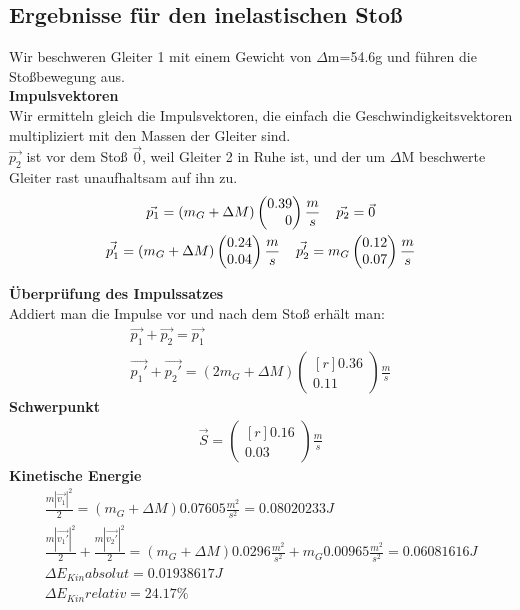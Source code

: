\documentclass{article}
\begin{document}
\subsection{Ergebnisse für den inelastischen Stoß}
Wir beschweren Gleiter 1 mit einem Gewicht von $\Delta$m=54.6g und führen die Stoßbewegung aus. \\
\textbf{Impulsvektoren}\\
Wir ermitteln gleich die Impulsvektoren, die einfach die Geschwindigkeitsvektoren multipliziert mit den Massen der Gleiter sind. \\
$\vec{p_2}$ ist vor dem Stoß $\vec{0}$, weil Gleiter 2 in Ruhe ist, und der um $\Delta$M beschwerte Gleiter rast unaufhaltsam auf ihn zu.
\begin{gather*}
\vec{p_1}=(m_G+\Delta M)
\begin{pmatrix*}[r]
0.39 \\ 0
\end{pmatrix*}\frac{m}{s} \hspace{0.4cm}
\vec{p_2}=\vec{0} \\
\vec{p_1'}=
(m_G+\Delta M)\begin{pmatrix*}[r]
0.24 \\ 0.04
\end{pmatrix*} \frac{m}{s}\hspace{0.4cm}
\vec{p_2'}=m_G\begin{pmatrix*}[r]
0.12 \\ 0.07
\end{pmatrix*} \frac{m}{s}
\end{gather*}

\textbf{Überprüfung des Impulssatzes} \\
Addiert man die Impulse vor und nach dem Stoß erhält man:
\begin{gather*}
\vec{p_1}+\vec{p_2}=\vec{p_1} \\
\vec{p_1'}+\vec{p_2'}=(2m_G+\Delta M)
\begin{pmatrix*}[r]
0.36 \\ 0.11
\end{pmatrix*} \frac{m}{s}
\end{gather*}
\textbf{Schwerpunkt}
\begin{gather*}
\vec{S}=
\begin{pmatrix*}[r]
0.16 \\ 0.03
\end{pmatrix*} \frac{m}{s}
\end{gather*}
\textbf{Kinetische Energie}
\begin{gather*}
\frac{m|\vec{v_1}|^2}{2}=(m_G+\Delta M)0.07605\frac{m^2}{s^2}=0.08020233J \\
\frac{m|\vec{v_1'}|^2}{2}+\frac{m|\vec{v_2'}|^2}{2}=(m_G+\Delta M)0.0296\frac{m^2}{s^2} + m_G0.00965\frac{m^2}{s^2}=0.06081616J \\
\Delta E_{Kin} absolut=0.01938617J \\
\Delta E_{Kin}relativ=24.17\%
\end{gather*}
\end{document}
